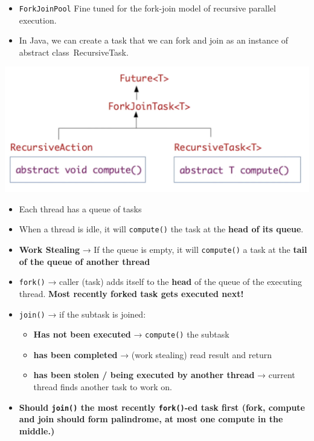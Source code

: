 \documentclass[12pt, landscape]{article}
\newcommand{\code}[1]{\colorbox{gray!25!}{\lstinline|#1|}}
\begin{document}
\begin{multicols*}{3}
\begin{itemize}
\item \code{ForkJoinPool} Fine tuned for the fork-join model of recursive parallel execution.
\item In Java, we can create a task that we can fork and join as an instance of abstract class RecursiveTask. 
\end{itemize}
\centerline{\includegraphics[width=\linewidth]{forkjointask}}
\begin{itemize}
\item Each thread has a queue of tasks
\item When a thread is idle, it will \code{compute()} the task at the \textbf{head of its queue}.
\item \textbf{Work Stealing} → If the queue is empty, it will \code{compute()} a task at the \textbf{tail of the queue of another thread}
\item \code{fork()} → caller (task) adds itself to the \textbf{head} of the queue of the executing thread. \textbf{Most recently forked task gets executed next!}
\item \code{join()} → if the subtask is joined: 
\begin{itemize}
\item \textbf{Has not been executed} → \code{compute()} the subtask
\item \textbf{has been completed} → (work stealing) read result and return
\item \textbf{has been stolen / being executed by another thread} → current thread finds another task to work on.
\end{itemize}
\item \textbf{Should \code{join()} the most recently \code{fork()}-ed task first (fork, compute and join should form palindrome, at most one compute in the middle.)}
\end{itemize}






\end{multicols*}
\end{document}
